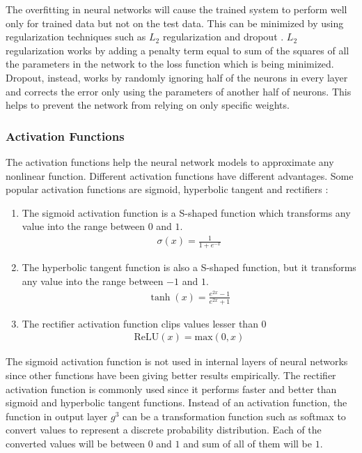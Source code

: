 \documentclass[a4paper, 11pt]{article}
\begin{document}
The overfitting in neural networks will cause the trained system to perform well only for trained data but not on the test data. This can be minimized by using regularization techniques such as $L_2$ regularization and dropout \parencite{Hinton2012}. $L_2$ regularization works by adding a penalty term equal to sum of the squares of all the parameters in the network to the loss function which is being minimized. Dropout, instead, works by randomly ignoring half of the neurons in every layer and corrects the error only using the parameters of another half of neurons. This helps to prevent the network from relying on only specific weights.

\subsubsection{Activation Functions}

The activation functions help the neural network models to approximate any nonlinear function. Different activation functions have different advantages. Some popular activation functions are sigmoid, hyperbolic tangent and rectifiers \parencite{Goldberg2016}:

\begin{enumerate}

\item The sigmoid activation function is a S-shaped function which transforms any value into the range between $0$ and $1$.  
\begin{align*}
\sigma (x) = \frac{1}{1 + e^{-x}}
\end{align*}

\item The hyperbolic tangent function is also a S-shaped function, but it transforms any value into the range between $-1$ and $1$.
\begin{align*}
\tanh (x) = \frac{e^{2x}-1}{e^{2x}+1}
\end{align*}

\item The rectifier activation function clips values lesser than $0$
\begin{align*}
\mathrm{ReLU}(x) = \mathrm{max}(0,x)
\end{align*}

\end{enumerate}

The sigmoid activation function is not used in internal layers of neural networks since other functions have been giving better results empirically. The rectifier activation function is commonly used since it performs faster and better than sigmoid and hyperbolic tangent functions. Instead of an activation function, the function in output layer $g^3$ can be a transformation function such as softmax to convert values to represent a discrete probability distribution. Each of the converted values will be between $0$ and $1$ and sum of all of them will be $1$.
\end{document}
